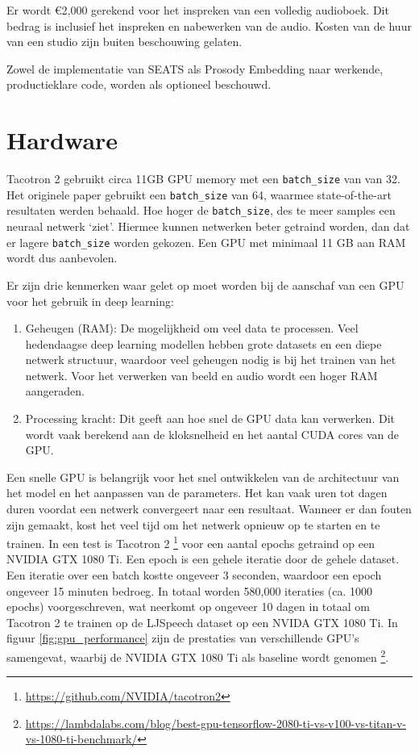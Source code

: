 Er wordt €2,000 gerekend voor het inspreken van een volledig audioboek. Dit bedrag is inclusief het inspreken en nabewerken van de audio. Kosten van de huur van een studio zijn buiten beschouwing gelaten.

Zowel de implementatie van SEATS als Prosody Embedding naar werkende, productieklare code, worden als optioneel beschouwd.


\section{Hardware}

Tacotron 2 gebruikt circa 11GB GPU memory met een \texttt{batch\_size} van van 32. Het originele paper gebruikt een \texttt{batch\_size} van 64, waarmee state-of-the-art resultaten werden behaald. Hoe hoger de \texttt{batch\_size}, des te meer samples een neuraal netwerk `ziet'. Hiermee kunnen netwerken beter getraind worden, dan dat er lagere \texttt{batch\_size} worden gekozen.  Een GPU met minimaal 11 GB aan RAM wordt dus aanbevolen.

Er zijn drie kenmerken waar gelet op moet worden bij de aanschaf van een GPU voor het gebruik in deep learning:
\begin{enumerate}
    \item Geheugen (RAM): De mogelijkheid om veel data te processen. Veel hedendaagse deep learning modellen hebben grote datasets en een diepe netwerk structuur, waardoor veel geheugen nodig is bij het trainen van het netwerk. Voor het verwerken van beeld en audio wordt een hoger RAM aangeraden.
    \item Processing kracht: Dit geeft aan hoe snel de GPU data kan verwerken. Dit wordt vaak berekend aan de kloksnelheid en het aantal CUDA cores van de GPU. 
\end{enumerate}

Een snelle GPU is belangrijk voor het snel ontwikkelen van de architectuur van het model en het aanpassen van de parameters. Het kan vaak uren tot dagen duren voordat een netwerk convergeert naar een resultaat. Wanneer er dan fouten zijn gemaakt, kost het veel tijd om het netwerk opnieuw op te starten en te trainen. In een test is Tacotron 2 \footnote{\url{https://github.com/NVIDIA/tacotron2}} voor een aantal epochs getraind op een NVIDIA GTX 1080 Ti. Een epoch is een gehele iteratie door de gehele dataset. Een iteratie over een batch kostte ongeveer 3 seconden, waardoor een epoch ongeveer 15 minuten bedroeg. In totaal worden 580,000 iteraties (ca. 1000 epochs) voorgeschreven, wat neerkomt op ongeveer 10 dagen in totaal om Tacotron 2 te trainen op de LJSpeech dataset op een NVIDA GTX 1080 Ti. In figuur \ref{fig:gpu_performance} zijn de prestaties van verschillende GPU's samengevat, waarbij de NVIDIA GTX 1080 Ti als baseline wordt genomen \footnote{\url{https://lambdalabs.com/blog/best-gpu-tensorflow-2080-ti-vs-v100-vs-titan-v-vs-1080-ti-benchmark/}}.

